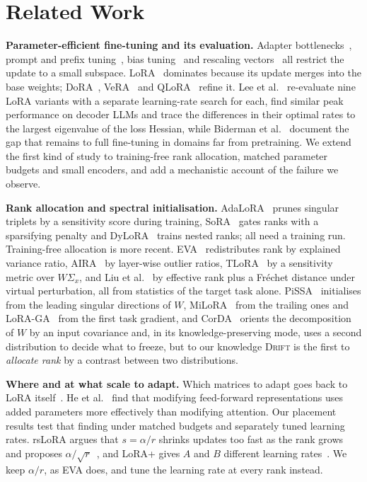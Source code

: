 \documentclass[conference]{IEEEtran}
\newcommand{\method}{\textsc{Drift}}
\begin{document}
\section{Related Work}

\noindent\textbf{Parameter-efficient fine-tuning and its evaluation.}
Adapter bottlenecks~\cite{houlsby2019adapters}, prompt and prefix
tuning~\cite{lester2021prompt,li2021prefix}, bias tuning~\cite{benzaken2022bitfit}
and rescaling vectors~\cite{liu2022ia3} all restrict the update to a small
subspace. LoRA~\cite{hu2022lora} dominates because its update merges into the
base weights; DoRA~\cite{liu2024dora}, VeRA~\cite{kopiczko2024vera} and
QLoRA~\cite{dettmers2023qlora} refine it. Lee et al.~\cite{lee2026lrmatters}
re-evaluate nine LoRA variants with a separate learning-rate search for each,
find similar peak performance on decoder LLMs and trace the differences in their
optimal rates to the largest eigenvalue of the loss Hessian, while Biderman
et al.~\cite{biderman2024lorlearnsless} document the gap that remains to full
fine-tuning in domains far from pretraining. We extend the first kind of study to
training-free rank allocation, matched parameter budgets and small encoders, and
add a mechanistic account of the failure we observe.

\noindent\textbf{Rank allocation and spectral initialisation.}
AdaLoRA~\cite{zhang2023adalora} prunes singular triplets by a sensitivity score
during training, SoRA~\cite{ding2023sora} gates ranks with a sparsifying penalty
and DyLoRA~\cite{valipour2023dylora} trains nested ranks; all need a training run.
Training-free allocation is more recent. EVA~\cite{paischer2025eva} redistributes
rank by explained variance ratio, AIRA~\cite{li2025aira} by layer-wise outlier
ratios, TLoRA~\cite{lin2026tlora} by a sensitivity metric over $W\Sigma_x$, and
Liu et al.~\cite{liu2026rsprobe} by effective rank plus a Fr\'echet distance
under virtual perturbation, all from statistics of the target task alone.
PiSSA~\cite{meng2024pissa} initialises from the leading singular directions of
$W$, MiLoRA~\cite{wang2025milora} from the trailing ones and
LoRA-GA~\cite{wang2024loraga} from the first task gradient, and
CorDA~\cite{yang2024corda} orients the decomposition of $W$ by an input
covariance and, in its knowledge-preserving mode, uses a second distribution to
decide what to freeze, but to our knowledge \method{} is the first to
\emph{allocate rank} by a contrast between two distributions.

\noindent\textbf{Where and at what scale to adapt.}
Which matrices to adapt goes back to LoRA itself~\cite[Sec.~7.1]{hu2022lora}.
He et al.~\cite{he2022unified} find that modifying feed-forward representations
uses added parameters more effectively than modifying attention. Our placement
results test that finding under matched budgets and separately tuned learning
rates. rsLoRA argues that $s = \alpha/r$ shrinks updates too fast as the rank
grows and proposes $\alpha/\sqrt{r}$~\cite{kalajdzievski2023rslora}, and LoRA+
gives $A$ and $B$ different learning rates~\cite{hayou2024loraplus}. We keep
$\alpha/r$, as EVA does, and tune the learning rate at every rank instead.
\end{document}
